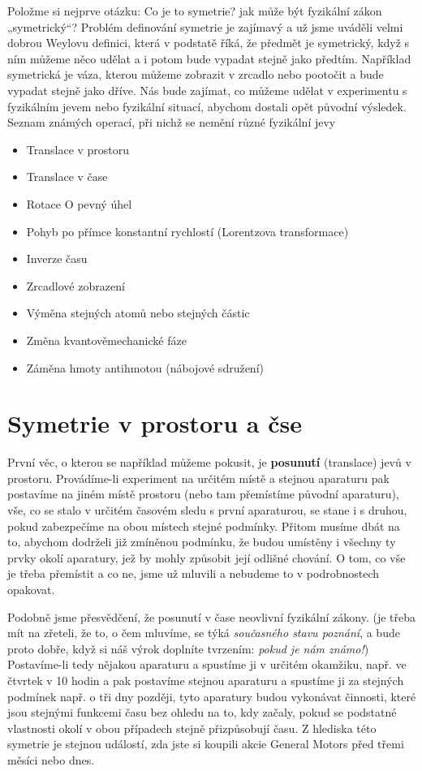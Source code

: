     Položme si nejprve otázku: Co je to symetrie? jak může být fyzikální zákon „symetrický“? Problém
    definování symetrie je zajímavý a už jsme uváděli velmi dobrou Weylovu deﬁnici, která v podstatě
    říká, že předmět je symetrický, když s ním můžeme něco udělat a i potom bude vypadat stejně jako
    předtím. Například symetrická je váza, kterou můžeme zobrazit v zrcadlo nebo pootočit a bude
    vypadat stejně jako dříve. Nás bude zajímat, co můžeme udělat v experimentu s fyzikálním jevem
    nebo fyzikální situací, abychom dostali opět původní výsledek. Seznam známých operací, při nichž
    se nemění různé fyzikální jevy
    \begin{itemize}[noitemsep]
      \item  Translace v prostoru
      \item  Translace v čase
      \item  Rotace O pevný úhel
      \item  Pohyb po přímce konstantní rychlostí (Lorentzova transformace)
      \item  Inverze času
      \item  Zrcadlové zobrazení
      \item  Výměna stejných atomů nebo stejných částic
      \item  Změna kvantověmechanické fáze
      \item  Záměna hmoty antihmotou (nábojové sdružení)
    \end{itemize}

  \section{Symetrie v prostoru a čse}\label{fyz:IchapLIIsecII}
    První věc, o kterou se například můžeme pokusit, je \textbf{posunutí} (translace) jevů v
    prostoru. Provádíme-li experiment na určitém místě a stejnou aparaturu pak postavíme na jiném
    místě prostoru (nebo tam přemístíme původní aparaturu), vše, co se stalo v určitém časovém sledu
    s první aparaturou, se stane i s druhou, pokud zabezpečíme na obou místech stejné podmínky.
    Přitom musíme dbát na to, abychom dodrželi již zmíněnou podmínku, že budou umístěny i všechny ty
    prvky okolí aparatury, jež by mohly způsobit její odlišné chování. O tom, co vše je třeba
    přemístit a co ne, jsme už mluvili a nebudeme to v podrobnostech opakovat.
    
    Podobně jsme přesvědčení, že posunutí v čase neovlivní fyzikální zákony. (je třeba mít na
    zřeteli, že to, o čem mluvíme, se týká \emph{současného stavu poznání}, a bude proto dobře, když
    si náš výrok doplníte tvrzením: \emph{pokud je nám známo!}) Postavíme-li tedy nějakou aparaturu
    a spustíme ji v určitém okamžiku, např. ve čtvrtek v 10 hodin a pak postavíme stejnou aparaturu
    a spustíme ji za stejných podmínek např. o tři dny později, tyto aparatury budou vykonávat
    činnosti, které jsou stejnými funkcemi času bez ohledu na to, kdy začaly, pokud se podstatné
    vlastnosti okolí v obou případech stejně přizpůsobují času. Z hlediska této symetrie je stejnou
    událostí, zda jste si koupili akcie General Motors před třemi měsíci nebo dnes.
    
